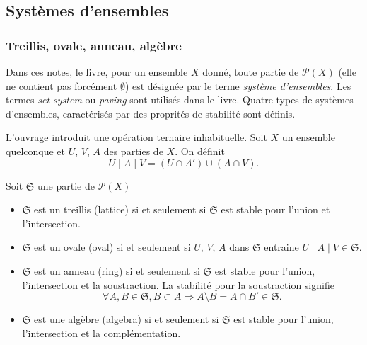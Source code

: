 \subsection{Systèmes d'ensembles}\label{SystEns}
\subsubsection{Treillis, ovale, anneau, algèbre}
Dans ces notes, le livre, pour un ensemble $X$ donné, toute partie de $\mathcal{P}(X)$ (elle ne contient pas forcément $\emptyset$) est désignée par le terme \emph{système d'ensembles}. Les termes \emph{set system} ou \emph{paving} sont utilisés dans le livre. Quatre types de systèmes d'ensembles, caractérisés par des proprités de stabilité sont définis.

L'ouvrage introduit une opération ternaire inhabituelle.\newline
Soit $X$ un ensemble quelconque et $U$, $V$, $A$ des parties de $X$. On définit
\begin{displaymath}
  U \mid A \mid V = (U \cap A') \cup ( A \cap V).
\end{displaymath}

\begin{defi}
  Soit $\mathfrak{S}$ une partie de $\mathcal{P}(X)$
  \begin{itemize}
    \item $\mathfrak{S}$ est un treillis (lattice) si et seulement si $\mathfrak{S}$ est stable pour l'union et l'intersection.
    \item $\mathfrak{S}$ est un ovale (oval) si et seulement si $U$, $V$, $A$ dans $\mathfrak{S}$ entraine $U \mid A \mid V \in \mathfrak{S}$.
    \item $\mathfrak{S}$ est un anneau (ring) si et seulement si $\mathfrak{S}$ est stable pour l'union, l'intersection et la soustraction. La stabilité pour la soustraction signifie
    \begin{displaymath}
      \forall A, B \in \mathfrak{S}, B \subset A \Rightarrow A \setminus B = A \cap B' \in \mathfrak{S}.
    \end{displaymath}
    \item $\mathfrak{S}$ est une algèbre (algebra) si et seulement si $\mathfrak{S}$ est stable pour l'union, l'intersection et la complémentation.
  \end{itemize}
\end{defi}

